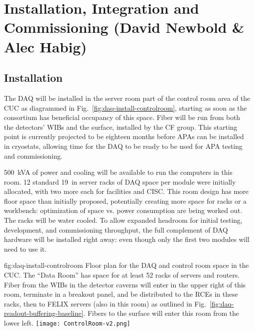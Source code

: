 
\section{Installation, Integration and Commissioning (David Newbold \& Alec Habig)}
\label{sec:fdsp-daq-install}


\subsection{Installation}
\label{sec:fdsp-daq-install-transport}

The DAQ will be installed in the server room part of the control room
area of the CUC as diagrammed in Fig.~\ref{fig:daq-install-controlroom},
starting as soon as the consortium has beneficial occupancy of this
space.  Fiber will be run from both the detectors' WIBs and the surface,
installed by the CF group.  This starting point is currently projected
to be eighteen months before APAs can be installed in cryostats,
allowing time for the DAQ to be ready to be used for APA testing and
commissioning.

\SI{500}{kVA} of power and cooling will be available to run the
computers in this room.  12 standard \SI{19}{in} server racks of DAQ
space per module were initially allocated, with two more each for
facilities and CISC.  This room design has more floor space than
initially proposed, potentially creating more space for racks or a
workbench: optimization of space vs. power consumption are being worked
out.  The racks will be water cooled. To allow expanded headroom for
initial testing, development, and commissioning throughput, the full
complement of DAQ hardware will be installed right away: even though
only the first two modules will need to use it.

\begin{dunefigure}{fig:daq-install-controlroom}
  {Floor plan for the DAQ and control room space in the CUC.  The ``Data
    Room'' has space for at least 52 racks of servers and routers.
    Fiber from the WIBs in the detector caverns will enter in the upper
    right of this room, terminate in a breakout panel, and be
    distributed to the RCEs in these racks, then to FELIX servers (also
    in this room) as outlined in
    Fig.~\ref{fig:daq-readout-buffering-baseline}.  Fibers to the
    surface will enter this room from the lower left.}
\texttt{[image: ControlRoom-v2.png]}
\end{dunefigure}

